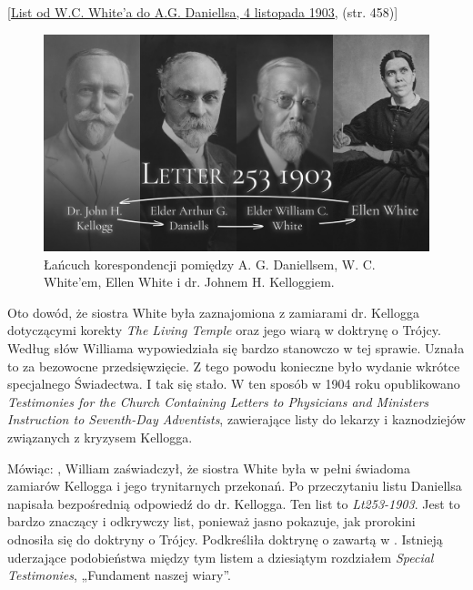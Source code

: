 [\href{https://ellenwhite.org/letterbooks/555}{List od W.C. White'a do A.G. Daniellsa, 4 listopada 1903,} (str. 458)]

\begin{figure}[h]
    \centering
    \includegraphics[width=1\linewidth]{images/correspondance.jpg}
    \caption*{Łańcuch korespondencji pomiędzy A. G. Daniellsem, W. C. White'em, Ellen White i dr. Johnem H. Kelloggiem.}
    \label{fig:corespondance}
\end{figure}

Oto dowód, że siostra White była zaznajomiona z zamiarami dr. Kellogga dotyczącymi korekty \textit{The Living Temple} oraz jego wiarą w doktrynę o Trójcy. Według słów Williama wypowiedziała się bardzo stanowczo w tej sprawie. Uznała to za bezowocne przedsięwzięcie. Z tego powodu konieczne było wydanie wkrótce specjalnego Świadectwa. I tak się stało. W ten sposób w 1904 roku opublikowano \textit{Testimonies for the Church Containing Letters to Physicians and Ministers Instruction to Seventh-Day Adventists}, zawierające listy do lekarzy i kaznodziejów związanych z kryzysem Kellogga.

Mówiąc: , William zaświadczył, że siostra White była w pełni świadoma zamiarów Kellogga i jego trynitarnych przekonań. Po przeczytaniu listu Daniellsa napisała bezpośrednią odpowiedź do dr. Kellogga. Ten list to \textit{Lt253-1903}. Jest to bardzo znaczący i odkrywczy list, ponieważ jasno pokazuje, jak prorokini odnosiła się do doktryny o Trójcy. Podkreśliła doktrynę o  zawartą w . Istnieją uderzające podobieństwa między tym listem a dziesiątym rozdziałem \textit{Special Testimonies}, „Fundament naszej wiary”.


